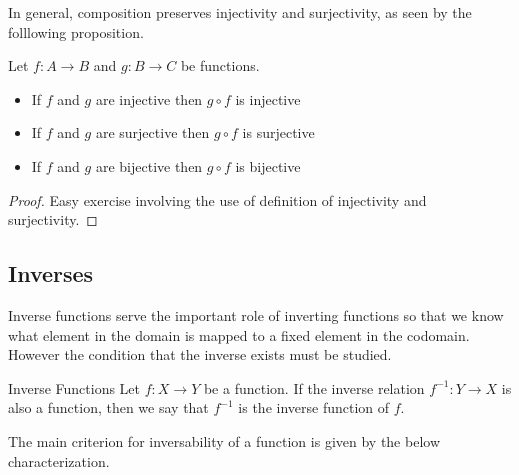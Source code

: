 \documentclass[a4paper]{article}
\begin{document}
In general, composition preserves injectivity and surjectivity, as seen by the folllowing proposition. 

\begin{prp}{}{} Let $f:A\to B$ and $g:B\to C$ be functions. 
\begin{itemize}
\item If $f$ and $g$ are injective then $g\circ f$ is injective
\item If $f$ and $g$ are surjective then $g\circ f$ is surjective
\item If $f$ and $g$ are bijective then $g\circ f$ is bijective
\end{itemize}
\begin{proof}
Easy exercise involving the use of definition of injectivity and surjectivity. 
\end{proof}
\end{prp}

\subsection{Inverses}
Inverse functions serve the important role of inverting functions so that we know what element in the domain is mapped to a fixed element in the codomain. However the condition that the inverse exists must be studied. 

\begin{defn}{Inverse Functions}{} Let $f:X\to Y$ be a function. If the inverse relation $f^{-1}:Y\to X$ is also a function, then we say that $f^{-1}$ is the inverse function of $f$. 
\end{defn}

The main criterion for inversability of a function is given by the below characterization. 
\end{document}

